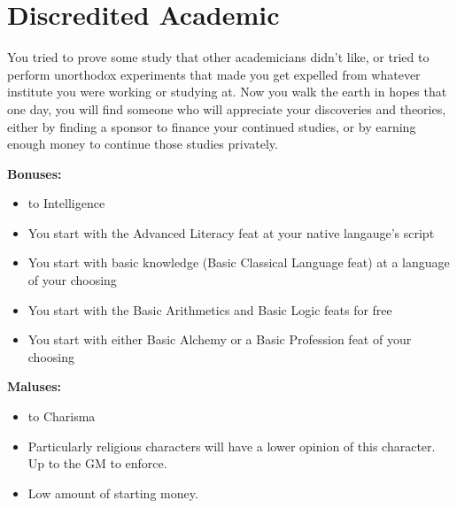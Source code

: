 \section{Discredited Academic}
You tried to prove some study that other academicians didn't like, or tried to perform unorthodox experiments that made you get expelled from whatever institute you were working or studying at. Now you walk the earth in hopes that one day, you will find someone who will appreciate your discoveries and theories, either by finding a sponsor to finance your continued studies, or by earning enough money to continue those studies privately.


\textbf{Bonuses:}
\begin{itemize}
	\item {} to Intelligence
	\item You start with the Advanced Literacy feat at your native langauge's script
	\item You start with basic knowledge (Basic Classical Language feat) at a language of your choosing
	\item You start with the Basic Arithmetics and Basic Logic feats for free
	\item You start with either Basic Alchemy or a Basic Profession feat of your choosing
\end{itemize}
\textbf{Maluses:}
\begin{itemize}
	\item {} to Charisma
	\item Particularly religious characters will have a lower opinion of this character. Up to the GM to enforce.
	\item Low amount of starting money.
\end{itemize}
